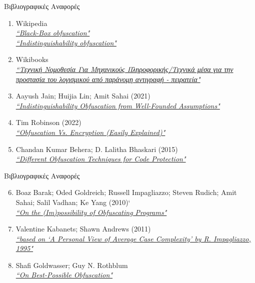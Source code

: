 \documentclass[xcolor=dvipsnames]{beamer}
\newcommand{\lt}{\latintext}
\begin{document}
\begin{frame}{Βιβλιογραφικές Αναφορές}

\begin{enumerate}
	\item {\lt Wikipedia}\\
	\href{https://en.wikipedia.org/wiki/Black-box_obfuscation}{\textit{\lt ``Black-Box obfuscation"}} \\
	\href{https://en.wikipedia.org/wiki/Indistinguishability_obfuscation}{\textit{\lt ``Indistinguishability obfuscation"}}
	\item {\lt Wikibooks}\\
	\href{https://tinyurl.com/43u57azu}{\textit{\small{\lt ``}Τεχνική Νομοθεσία Για Μηχανικούς Πληροφορικής/Τεχνικά μέσα για την προστασία του λογισμικού από παράνομη αντιγραφή - πειρατεία{\lt "}}}
	\item {\lt Aayush Jain; Huijia Lin; Amit Sahai} (2021)\\
	\href{https://dl.acm.org/doi/pdf/10.1145/3406325.3451093}{\textit{\lt \small ``Indistinguishability Obfuscation from Well-Founded
Assumptions"}}
	\item {\lt Tim Robinson} (2022)\\
	\href{https://cybersynchs.com/obfuscation-vs-encryption/}{\textit{\lt ``Obfuscation Vs. Encryption (Easily Explained)"}}
	\item {\lt Chandan Kumar Behera; D. Lalitha Bhaskari} (2015)\\
	\href{https://tinyurl.com/2p8cuumm}{\textit{\lt ``Different Obfuscation Techniques for Code Protection"}}
\end{enumerate}
\end{frame}

\begin{frame}{Βιβλιογραφικές Αναφορές}
\begin{enumerate}
\setcounter{enumi}{5}
	\item {\lt Boaz Barak; Oded Goldreich; Russell Impagliazzo; Steven Rudich; Amit Sahai; Salil Vadhan; Ke Yang (2010)`}\\
	\href{https://www.boazbarak.org/Papers/obfuscate.pdf}{\textit{\lt ``On the (Im)possibility of Obfuscating Programs"}}
	\item {\lt  Valentine Kabanets; Shawn Andrews (2011)}\\
	\href{https://tinyurl.com/2p8z8zja}{\textit{\small \lt ``based on `A Personal View of Average Case Complexity' by R. Impagliazzo, 1995"}}
	\item {\lt Shafi Goldwasser; Guy N. Rothblum}\\
	\href{https://www.microsoft.com/en-us/research/wp-content/uploads/2007/01/GoldwasserR07.pdf}{\textit{\lt ``On Best-Possible Obfuscation"}}
\end{enumerate}

\end{frame}
\end{document}
